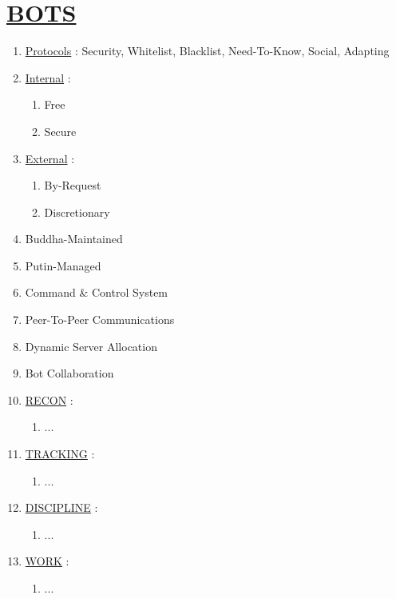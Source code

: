\documentclass[11pt]{article}
\begin{document}
\section*{\ul{BOTS}}
\begin{enumerate}
	\item[] \ul{Protocols} : Security, Whitelist, Blacklist, Need-To-Know, Social, Adapting

	\item[] \ul{Internal}  :
	\begin{enumerate}
		\item[] Free
		\item[] Secure
	\end{enumerate}
	
	\item[] \ul{External} :
	\begin{enumerate}
		\item[] By-Request
		\item[] Discretionary
	\end{enumerate}

	\item[] Buddha-Maintained
	\item[] Putin-Managed
	\item[] Command \& Control System
	\item[] Peer-To-Peer Communications
	\item[] Dynamic Server Allocation
	\item[] Bot Collaboration

	\item[] \ul{RECON} :
	\begin{enumerate}
		\item[] ...
	\end{enumerate}

	\item[] \ul{TRACKING} :
	\begin{enumerate}
		\item[] ...
	\end{enumerate}

	\item[] \ul{DISCIPLINE} :
	\begin{enumerate}
		\item[] ...
	\end{enumerate}

	\item[] \ul{WORK} :
	\begin{enumerate}
		\item[] ...
	\end{enumerate}


\end{enumerate}
\end{document}
